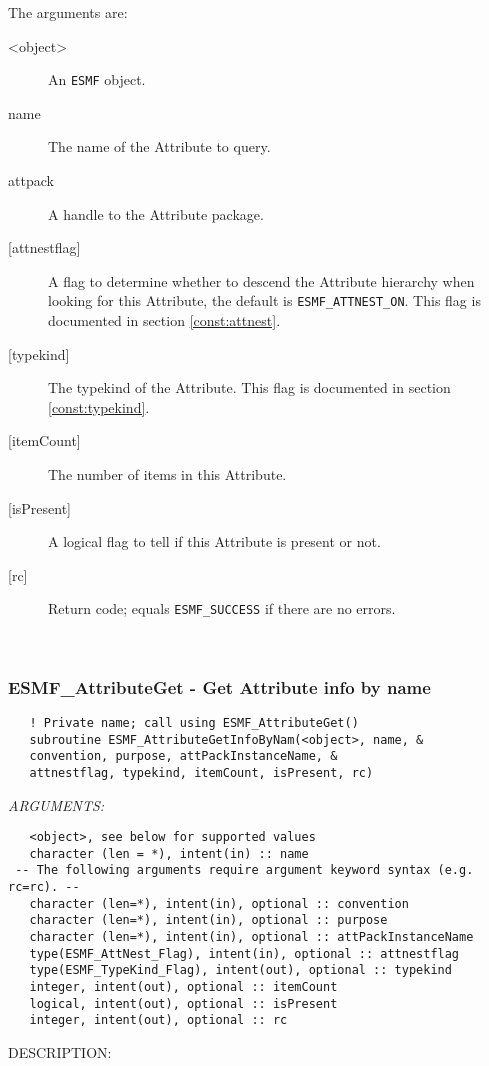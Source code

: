    The arguments are:
   \begin{description}
   \item [<object>]
   An {\tt ESMF} object.
   \item [name]
   The name of the Attribute to query.
   \item [attpack]
   A handle to the Attribute package.
   \item [{[attnestflag]}]
   A flag to determine whether to descend the
   Attribute hierarchy when looking for this Attribute, the default
   is {\tt ESMF\_ATTNEST\_ON}. This flag is documented in section
   \ref{const:attnest}.
   \item [{[typekind]}]
   The typekind of the Attribute. This flag is documented in section
   \ref{const:typekind}.
   \item [{[itemCount]}]
   The number of items in this Attribute.
   \item [{[isPresent]}]
   A logical flag to tell if this Attribute is present or not.
   \item [{[rc]}]
   Return code; equals {\tt ESMF\_SUCCESS} if there are no errors.
   \end{description}
  
   
 
\mbox{}\hrulefill\ 
 
\subsubsection [ESMF\_AttributeGet] {ESMF\_AttributeGet - Get Attribute info by name}


  
\begin{verbatim}   ! Private name; call using ESMF_AttributeGet()
   subroutine ESMF_AttributeGetInfoByNam(<object>, name, &
   convention, purpose, attPackInstanceName, &
   attnestflag, typekind, itemCount, isPresent, rc)\end{verbatim}{\em ARGUMENTS:}
\begin{verbatim}   <object>, see below for supported values
   character (len = *), intent(in) :: name
 -- The following arguments require argument keyword syntax (e.g. rc=rc). --
   character (len=*), intent(in), optional :: convention
   character (len=*), intent(in), optional :: purpose
   character (len=*), intent(in), optional :: attPackInstanceName
   type(ESMF_AttNest_Flag), intent(in), optional :: attnestflag
   type(ESMF_TypeKind_Flag), intent(out), optional :: typekind
   integer, intent(out), optional :: itemCount
   logical, intent(out), optional :: isPresent
   integer, intent(out), optional :: rc\end{verbatim}
{\sf DESCRIPTION:\\ }



